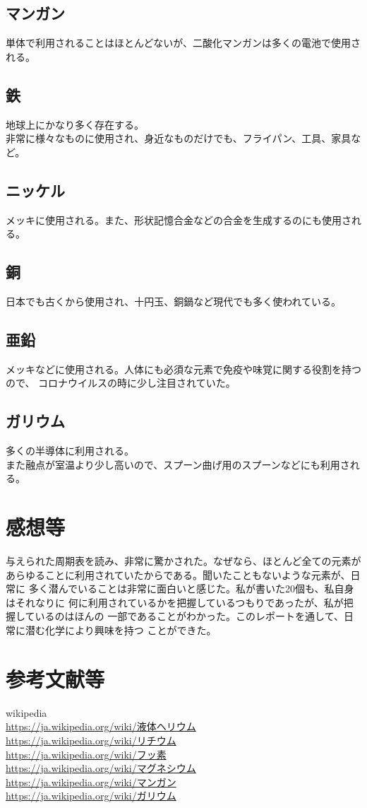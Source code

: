 \documentclass[dvipdfmx,autodetect-engine,titlepage]{jsarticle}
\begin{document}
\subsection{マンガン}
単体で利用されることはほとんどないが、二酸化マンガンは多くの電池で使用される。

\subsection{鉄}
地球上にかなり多く存在する。\\
非常に様々なものに使用され、身近なものだけでも、フライパン、工具、家具など。

\subsection{ニッケル}
メッキに使用される。また、形状記憶合金などの合金を生成するのにも使用される。

\subsection{銅}
日本でも古くから使用され、十円玉、銅鍋など現代でも多く使われている。

\subsection{亜鉛}
メッキなどに使用される。人体にも必須な元素で免疫や味覚に関する役割を持つので、
コロナウイルスの時に少し注目されていた。

\subsection{ガリウム}
多くの半導体に利用される。\\
また融点が室温より少し高いので、スプーン曲げ用のスプーンなどにも利用される。

\section{感想等}
与えられた周期表を読み、非常に驚かされた。なぜなら、ほとんど全ての元素が
あらゆることに利用されていたからである。聞いたこともないような元素が、日常に
多く潜んでいることは非常に面白いと感じた。私が書いた20個も、私自身はそれなりに
何に利用されているかを把握しているつもりであったが、私が把握しているのはほんの
一部であることがわかった。このレポートを通して、日常に潜む化学により興味を持つ
ことができた。


\section{参考文献等}
wikipedia\\

\url{https://ja.wikipedia.org/wiki/液体ヘリウム}\\

\url{https://ja.wikipedia.org/wiki/リチウム}\\

\url{https://ja.wikipedia.org/wiki/フッ素}\\

\url{https://ja.wikipedia.org/wiki/マグネシウム}\\

\url{https://ja.wikipedia.org/wiki/マンガン}\\

\url{https://ja.wikipedia.org/wiki/ガリウム}\\
\end{document}
